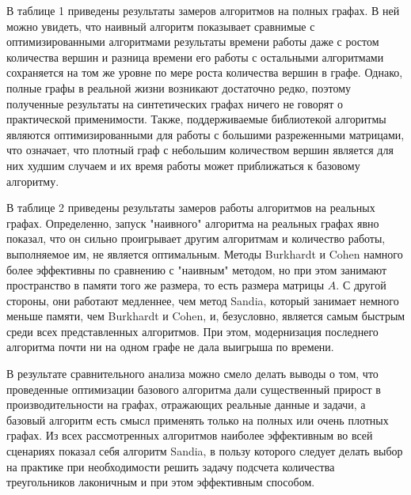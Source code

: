 \documentclass[14pt]{matmex-diploma}
\begin{document}
В таблице 1 приведены результаты замеров алгоритмов на полных графах. В ней можно увидеть, что наивный алгоритм показывает сравнимые с оптимизированными алгоритмами результаты времени работы даже с ростом количества вершин и разница времени его работы с остальными алгоритмами сохраняется на том же уровне по мере роста количества вершин в графе. Однако, полные графы в реальной жизни возникают достаточно редко, поэтому полученные результаты на синтетических графах ничего не говорят о практической применимости. Также, поддерживаемые библиотекой алгоритмы являются оптимизированными для работы с большими разреженными матрицами, что означает, что плотный граф с небольшим количеством вершин является для них худшим случаем и их время работы может приближаться к базовому алгоритму.

В таблице 2 приведены результаты замеров работы алгоритмов на реальных графах. Определенно, запуск "наивного" алгоритма на реальных графах явно показал, что он сильно проигрывает другим алгоритмам и количество работы, выполняемое им, не является оптимальным. Методы Burkhardt и Cohen намного более эффективны по сравнению с "наивным" методом, но при этом занимают пространство в памяти того же размера, то есть размера матрицы $A$. С другой стороны, они работают медленнее, чем метод Sandia, который занимает немного меньше памяти, чем Burkhardt и Cohen, и, безусловно, является самым быстрым среди всех представленных алгоритмов. При этом, модернизация последнего алгоритма почти ни на одном графе не дала выигрыша по времени.

В результате сравнительного анализа можно смело делать выводы о том, что проведенные оптимизации базового алгоритма дали существенный прирост в производительности на графах, отражающих реальные данные и задачи, а базовый алгоритм есть смысл применять только на полных или очень плотных графах. Из всех рассмотренных алгоритмов наиболее эффективным во всей сценариях показал себя алгоритм Sandia, в пользу которого следует делать выбор на практике при необходимости решить задачу подсчета количества треугольников лаконичным и при этом эффективным способом.
\end{document}
